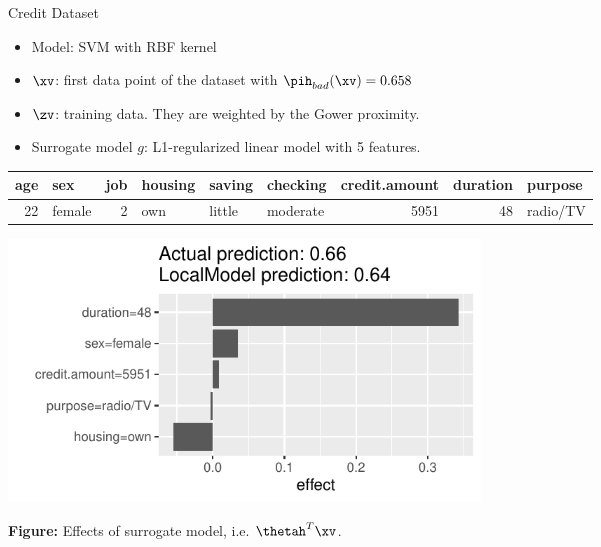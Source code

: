 \documentclass[11pt,compress,t,notes=noshow, xcolor=table]{beamer}
\begin{document}
\begin{vbframe}{Credit Dataset}
	\begin{itemize}
		\item Model: SVM with RBF kernel
		\item $\xv$: first data point of the dataset with $\pih_{bad}(\xv) = 0.658$
		\item $\zv$: training data. They are weighted by the Gower proximity. 
		\item Surrogate model $g$: L1-regularized linear model with 5 features. 
	\end{itemize}
\vspace{-0.5cm}
	\begin{table}[ht]
		\centering
		\scriptsize
		\begin{tabular}{rlrlllrrl}
			\hline
			age & sex & job & housing & saving & checking & credit.amount & duration & purpose \\ 
			\hline
			 22 & female &   2 & own & little & moderate & 5951 &  48 & radio/TV \\ 
			\hline
		\end{tabular}
	\end{table}
\vspace{-0.5cm}
\begin{center}
	\includegraphics[width=0.55\textwidth]{figure/lime_credit.pdf}
	
	\tiny{\textbf{Figure:} Effects of surrogate model, i.e. $\thetah^T \xv$.}
	
\end{center}


\end{vbframe}
\end{document}
